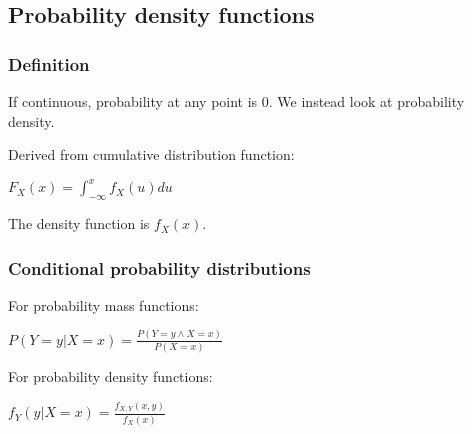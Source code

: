 
\subsection{Probability density functions}

\subsubsection{Definition}

If continuous, probability at any point is \(0\). We instead look at probability density.

Derived from cumulative distribution function:

\(F_X(x)=\int_{-\infty}^x f_X(u)du\)

The density function is \(f_X(x)\).

\subsubsection{Conditional probability distributions}

For probability mass functions:

\(P(Y=y|X=x)=\frac{P(Y=y\land X=x)}{P(X=x)}\)

For probability density functions:

\(f_Y(y|X=x)=\frac{f_{X,Y}(x,y)}{f_X(x)}\)

